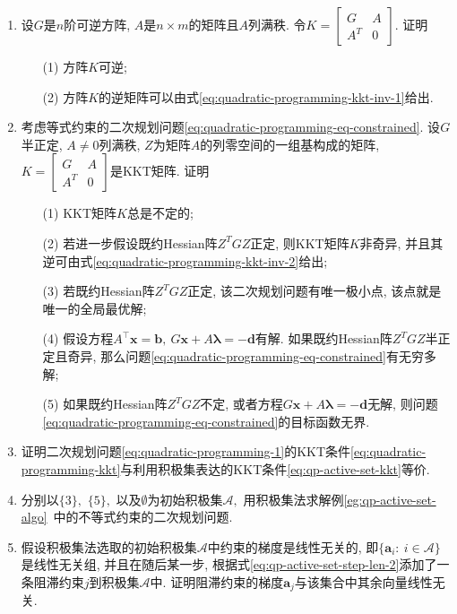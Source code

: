 \documentclass{SBCbookchapter}
\newcommand{\V}[1]{{\bm{#1}}}
\numberwithin{equation}{section}
\begin{document}
\begin{enumerate}
\item 设$G$是$n$阶可逆方阵, $A$是$n\times m$的矩阵且$A$列满秩. 令$K = \begin{bmatrix} G & A \\ A^T & 0 \end{bmatrix}.$ 证明
\begin{itemize}
    \item[(1)] 方阵$K$可逆;
    \item[(2)] 方阵$K$的逆矩阵可以由式\eqref{eq:quadratic-programming-kkt-inv-1}给出.
\end{itemize}

\item 考虑等式约束的二次规划问题\eqref{eq:quadratic-programming-eq-constrained}. 设$G$半正定, $A \neq 0$列满秩, $Z$为矩阵$A$的列零空间的一组基构成的矩阵, $K = \begin{bmatrix} G & A \\ A^T & 0 \end{bmatrix}$是KKT矩阵. 证明
\begin{itemize}
    \item[(1)] KKT矩阵$K$总是不定的;
    \item[(2)] 若进一步假设既约Hessian阵$Z^T G Z$正定, 则KKT矩阵$K$非奇异, 并且其逆可由式\eqref{eq:quadratic-programming-kkt-inv-2}给出;
    \item[(3)] 若既约Hessian阵$Z^T G Z$正定, 该二次规划问题有唯一极小点, 该点就是唯一的全局最优解;
    \item[(4)] 假设方程$A^⊤ \V{x} = \V{b}, ~ G \V{x} + A \V{\lambda} = − \V{d}$有解. 如果既约Hessian阵$Z^T G Z$半正定且奇异, 那么问题\eqref{eq:quadratic-programming-eq-constrained}有无穷多解;
    \item[(5)] 如果既约Hessian阵$Z^T G Z$不定, 或者方程$G \V{x} + A \V{\lambda} = − \V{d}$无解, 则问题\eqref{eq:quadratic-programming-eq-constrained}的目标函数无界.
\end{itemize}

\item 证明二次规划问题\eqref{eq:quadratic-programming-1}的KKT条件\eqref{eq:quadratic-programming-kkt}与利用积极集表达的KKT条件\eqref{eq:qp-active-set-kkt}等价.

\item 分别以$\{3\},$ $\{5\},$ 以及$\emptyset$为初始积极集$\mathcal{A},$ 用积极集法求解例\ref{eg:qp-active-set-algo}~中的不等式约束的二次规划问题.

\item 假设积极集法选取的初始积极集$\mathcal{A}$中约束的梯度是线性无关的, 即$\{ \V{a}_i: ~ i \in \mathcal{A} \}$是线性无关组, 并且在随后某一步, 根据式\eqref{eq:qp-active-set-step-len-2}添加了一条阻滞约束$j$到积极集$\mathcal{A}$中. 证明阻滞约束的梯度$\V{a}_j$与该集合中其余向量线性无关.


\end{enumerate}
\end{document}
